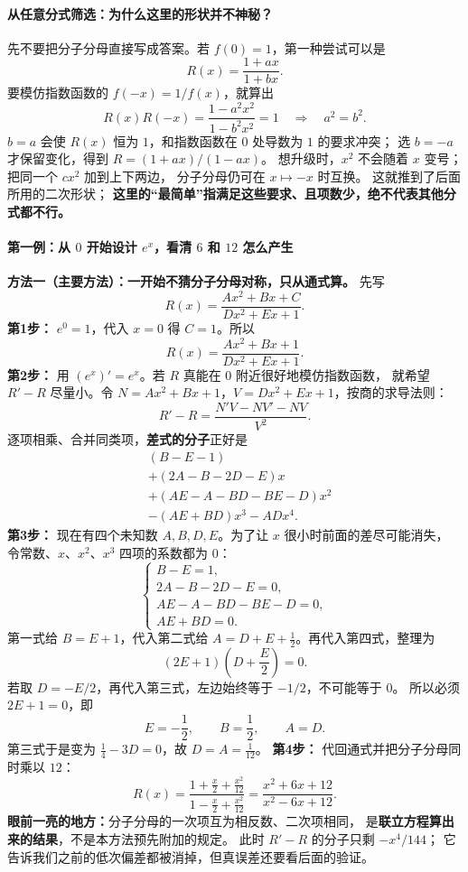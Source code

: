 \begin{proofbox}
\medskip

\paragraph{从任意分式筛选：为什么这里的形状并不神秘？}
先不要把分子分母直接写成答案。若 $f(0)=1$，第一种尝试可以是
\[
 R(x)=\frac{1+ax}{1+bx}.
\]
要模仿指数函数的 $f(-x)=1/f(x)$，就算出
\[
 R(x)R(-x)=\frac{1-a^2x^2}{1-b^2x^2}=1
 \quad\Longrightarrow\quad a^2=b^2.
\]
$b=a$ 会使 $R(x)$ 恒为 $1$，和指数函数在 $0$ 处导数为 $1$ 的要求冲突；
选 $b=-a$ 才保留变化，得到 $R=(1+ax)/(1-ax)$。
想升级时，$x^2$ 不会随着 $x$ 变号；把同一个 $cx^2$ 加到上下两边，
分子分母仍可在 $x\mapsto -x$ 时互换。
这就推到了后面所用的二次形状；
\textbf{这里的“最简单”指满足这些要求、且项数少，绝不代表其他分式都不行。}
\paragraph{第一例：从 $0$ 开始设计 $e^x$，看清 $6$ 和 $12$ 怎么产生}

\medskip
\noindent\textbf{方法一（主要方法）：一开始不猜分子分母对称，只从通式算。}
先写
\[
 R(x)=\frac{Ax^2+Bx+C}{Dx^2+Ex+1}.
\]
\textbf{第1步：} $e^0=1$，代入 $x=0$ 得 $C=1$。所以
\[
 R(x)=\frac{Ax^2+Bx+1}{Dx^2+Ex+1}.
\]
\textbf{第2步：} 用 $(e^x)'=e^x$。若 $R$ 真能在 $0$ 附近很好地模仿指数函数，
就希望 $R'-R$ 尽量小。令
$N=Ax^2+Bx+1$，$V=Dx^2+Ex+1$，按商的求导法则：
\[
 R'-R=\frac{N'V-NV'-NV}{V^2}.
\]
逐项相乘、合并同类项，\textbf{差式的分子}正好是
\[
 \begin{aligned}
 &(B-E-1)\\
 &+(2A-B-2D-E)x\\
 &+(AE-A-BD-BE-D)x^2\\
 &-(AE+BD)x^3-ADx^4.
 \end{aligned}
\]
\textbf{第3步：} 现在有四个未知数 $A,B,D,E$。为了让 $x$ 很小时前面的差尽可能消失，
令常数、$x$、$x^2$、$x^3$ 四项的系数都为 $0$：
\[
 \begin{cases}
 B-E=1,\\
 2A-B-2D-E=0,\\
 AE-A-BD-BE-D=0,\\
 AE+BD=0.
 \end{cases}
\]
第一式给 $B=E+1$，代入第二式给
$A=D+E+\frac12$。再代入第四式，整理为
\[
 \left(2E+1\right)\left(D+\frac E2\right)=0.
\]
若取 $D=-E/2$，再代入第三式，左边始终等于 $-1/2$，不可能等于 $0$。
所以必须 $2E+1=0$，即
\[
 E=-\frac12,\qquad B=\frac12,\qquad A=D.
\]
第三式于是变为 $\frac14-3D=0$，故 $D=A=\frac1{12}$。
\textbf{第4步：} 代回通式并把分子分母同时乘以 $12$：
\[
 \boxed{R(x)=\frac{1+\frac{x}{2}+\frac{x^2}{12}}
 {1-\frac{x}{2}+\frac{x^2}{12}}
 =\frac{x^2+6x+12}{x^2-6x+12}}.
\]
\textbf{眼前一亮的地方：}分子分母的一次项互为相反数、二次项相同，
是\textbf{联立方程算出来的结果}，不是本方法预先附加的规定。
此时 $R'-R$ 的分子只剩 $-x^4/144$；
它告诉我们之前的低次偏差都被消掉，但真误差还要看后面的验证。


\end{proofbox}
